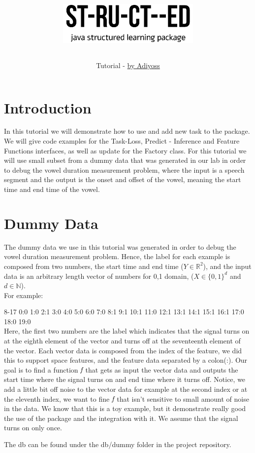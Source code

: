 \documentclass[11pt, oneside]{article}   	%
\title{\centerline{\includegraphics[width=7cm]{img/logo.png}}}
\author{Tutorial - \href{http://adiyoss.github.io/}{by Adiyoss}}
\begin{document}
\maketitle
\section{Introduction}
In this tutorial we will demonstrate how to use and add new task to the \stred package. We will give code examples for the Task-Loss, Predict - Inference and Feature Functions interfaces, as well as update for the Factory class. For this tutorial we will use small subset from a dummy data that was generated in our lab in order to debug the vowel duration measurement problem, where the input is a speech segment and the output is the onset and offset of the vowel, meaning the start time and end time of the vowel.
\section{Dummy Data}
The dummy data we use in this tutorial was generated in order to debug the vowel duration measurement problem. Hence, the label for each example is composed from two numbers, the start time and end time ($Y\in{\mathbb{R}}^2$), and the input data is an arbitrary length vector of numbers for 0,1 domain, ($X \in{\{0,1\}}^d$ and $d\in{\mathbb{N}}$). \\
For example: 

8-17 0:0 1:0 2:1 3:0 4:0 5:0 6:0 7:0 8:1 9:1 10:1 11:0 12:1 13:1 14:1 15:1 16:1 17:0 18:0 19:0\\
Here, the first two numbers are the label which indicates that the signal turns on at the eighth element of the vector and turns off at the seventeenth element of the vector. Each vector data is composed from the index of the feature, we did this to support space features, and the feature data separated by a colon(:). Our goal is to find a function $\emph{f}$ that gets as input the vector data and outputs the start time where the signal turns on and end time where it turns off. Notice, we add a little bit off noise to the vector data for example at the second index or at the eleventh index, we want to fine $\emph{f}$ that isn't sensitive to small amount of noise in the data. We know that this is a toy example, but it demonstrate really good the use of the package and the integration with it. We assume that the signal turns on only once.

The db can be found under the db/dummy folder in the project repository.
\end{document}
